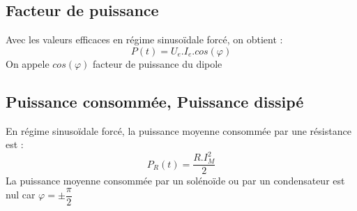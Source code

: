 \subsection{Facteur de puissance}
\begin{de}
Avec les valeurs efficaces en régime sinusoïdale forcé, on obtient :
$$P(t) = U_e.I_e.cos(\varphi)$$
On appele $cos(\varphi)$ facteur de puissance du dipole
\end{de}
\subsection{Puissance consommée, Puissance dissipé}
En régime sinusoïdale forcé, la puissance moyenne consommée par une résistance est :
$$P_R(t) = \dfrac{R.I_M^2}{2}$$
La puissance moyenne consommée par un solénoïde ou par un condensateur est nul car $\varphi = \pm \dfrac{\pi}{2}$ 
